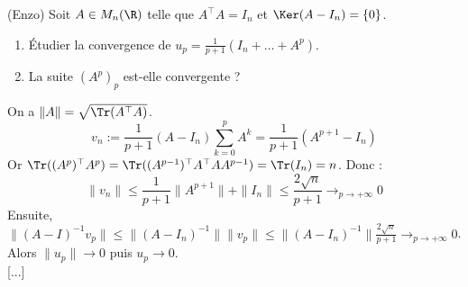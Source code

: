 \documentclass[11pt]{article}
\begin{document}
\pagebreak

\begin{exercice}{(Enzo)}{}
    Soit $A\in M_n(\R)$ telle que $A^\top A=I_n$ et $\Ker(A-I_n)=\{0\}$.
    \begin{enumerate}
        \item Étudier la convergence de $u_p=\frac{1}{p+1}\left( I_n + ... + A^p \right)$.
        \item La suite $(A^p)_p$ est-elle convergente ?
    \end{enumerate}
    \tcblower
     On a $\|A\|=\sqrt{\Tr(A^\top A)}$.
    \begin{equation*}
        v_n := \frac{1}{p+1}\left( A - I_n \right)\sum_{k=0}^pA^k = \frac{1}{p+1}\left( A^{p+1} - I_n \right)
    \end{equation*}
    Or $\Tr((A^p)^\top A^p)=\Tr((A^{p-1})^\top A^\top A A^{p-1})=\Tr(I_n)=n$. Donc :
    \begin{equation*}
        \|v_n\|\leq\frac{1}{p+1}\|A^{p+1}\|+\|I_n\| \leq \frac{2\sqrt{n}}{p+1} \to_{p\to+\infty} 0
    \end{equation*}
    Ensuite, $\|(A-I)^{-1}v_p\|\leq\|(A-I_n)^{-1}\|\|v_p\|\leq\|(A-I_n)^{-1}\|\frac{2\sqrt{n}}{p+1}\to_{p\to+\infty}0$.\\
    Alors $\|u_p\|\to 0$ puis $u_p\to0$.\\
     [...]
\end{exercice}
\end{document}

